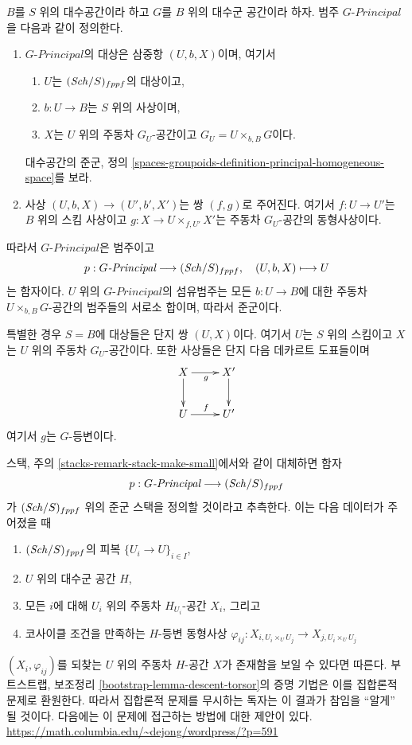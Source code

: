 \noindent
$B$를 $S$ 위의 대수공간이라 하고 $G$를 $B$ 위의 대수군 공간이라 하자.
범주 $G\textit{-Principal}$을 다음과 같이 정의한다.
\begin{enumerate}
\item $G\textit{-Principal}$의 대상은 삼중항 $(U, b, X)$이며, 여기서
\begin{enumerate}
\item $U$는 $(\mathit{Sch}/S)_{fppf}$의 대상이고,
\item $b : U \to B$는 $S$ 위의 사상이며,
\item $X$는 $U$ 위의 주동차 $G_U$-공간이고
$G_U = U \times_{b, B} G$이다.
\end{enumerate}
대수공간의 준군, 정의
\ref{spaces-groupoids-definition-principal-homogeneous-space}를 보라.
\item 사상 $(U, b, X) \to (U', b', X')$는 쌍 $(f, g)$로 주어진다.
여기서 $f : U \to U'$는 $B$ 위의 스킴 사상이고
$g : X \to U \times_{f, U'} X'$는 주동차 $G_U$-공간의 동형사상이다.
\end{enumerate}
따라서 $G\textit{-Principal}$은 범주이고
$$
p : G\textit{-Principal} \longrightarrow (\mathit{Sch}/S)_{fppf},
\quad
(U, b, X) \longmapsto U
$$
는 함자이다. $U$ 위의 $G\textit{-Principal}$의 섬유범주는 모든
$b : U \to B$에 대한 주동차 $U \times_{b, B} G$-공간의 범주들의 서로소
합이며, 따라서 준군이다.

\medskip\noindent
특별한 경우 $S = B$에 대상들은 단지 쌍 $(U, X)$이다. 여기서 $U$는
$S$ 위의 스킴이고 $X$는 $U$ 위의 주동차 $G_U$-공간이다. 또한 사상들은
단지 다음 데카르트 도표들이며
$$
\xymatrix{
X \ar[d] \ar[r]_g & X' \ar[d] \\
U \ar[r]^f & U'
}
$$
여기서 $g$는 $G$-등변이다.

\begin{remark}
\label{remark-principal-stack-in-groupoids}
스택, 주의 \ref{stacks-remark-stack-make-small}에서와 같이 대체하면 함자
$$
p : G\textit{-Principal} \longrightarrow (\mathit{Sch}/S)_{fppf}
$$
가 $(\mathit{Sch}/S)_{fppf}$ 위의 준군 스택을 정의할 것이라고 추측한다. 이는 다음
데이터가 주어졌을 때
\begin{enumerate}
\item $(\mathit{Sch}/S)_{fppf}$의 피복 $\{U_i \to U\}_{i \in I}$,
\item $U$ 위의 대수군 공간 $H$,
\item 모든 $i$에 대해 $U_i$ 위의 주동차 $H_{U_i}$-공간 $X_i$, 그리고
\item 코사이클 조건을 만족하는 $H$-등변 동형사상
$\varphi_{ij} : X_{i, U_i \times_U U_j} \to X_{j, U_i \times_U U_j}$
\end{enumerate}
$(X_i, \varphi_{ij})$를 되찾는 $U$ 위의 주동차 $H$-공간 $X$가 존재함을
보일 수 있다면 따른다. 부트스트랩, 보조정리
\ref{bootstrap-lemma-descent-torsor}의 증명 기법은 이를 집합론적 문제로
환원한다. 따라서 집합론적 문제를 무시하는 독자는 이 결과가 참임을
``알게'' 될 것이다. 다음에는 이 문제에 접근하는 방법에 대한 제안이 있다.
\url{https://math.columbia.edu/~dejong/wordpress/?p=591}
\end{remark}



